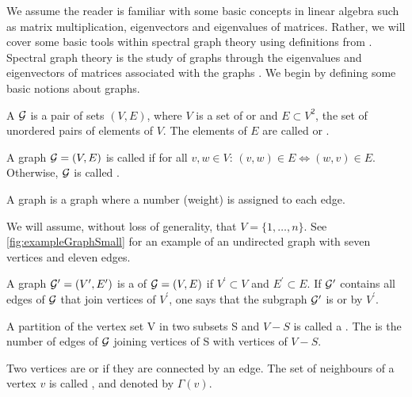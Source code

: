 We assume the reader is familiar with some basic concepts in linear algebra such as matrix multiplication, eigenvectors and eigenvalues of matrices. Rather, we will cover some basic tools within spectral graph theory using definitions from \cite{For10,New06a, Spi12, Spi07}. Spectral graph theory is the study of graphs through the eigenvalues and eigenvectors of matrices associated with the graphs \cite{Spi12}. We begin by defining some basic notions about graphs.
\begin{definition}
	\label{def:graph}
	A  $\mathcal G$ is a pair of sets $(V,E)$, where $V$ is a set of  or  and $E \subset V^{2}$, the set of unordered pairs of elements of $V$. The elements of $E$ are called  or .
\end{definition}
\begin{definition}
	\label{def:undirectedGraph}
	A graph $\mathcal G = (V,E)$ is called  if for all $v,w \in V$: $(v,w) \in E \iff (w,v) \in E$. Otherwise, $\mathcal G$ is called .
\end{definition}
\begin{definition}
	\label{def:weightedGraph}
	A  graph is a graph where a number (weight) is assigned to each edge.
\end{definition}
We will assume, without loss of generality, that $V = \{1,\dots,n\}$. See \cref{fig:exampleGraphSmall} for an example of an undirected graph with seven vertices and eleven edges.
\begin{definition}
	\label{def:subGraph}
	A graph $\mathcal G^{\prime} = (V^{\prime},E^{\prime})$ is a  of $\mathcal G = (V,E)$ if $V^{\prime} \subset V$ and $E^{\prime} \subset E$. If $\mathcal G^{\prime}$ contains all edges of $\mathcal G$ that join vertices of $V^{\prime}$, one says that the subgraph $\mathcal G^{\prime}$ is  or  by $V^{\prime}$.
\end{definition}
\begin{definition}
	\label{def:cuts}
	A partition of the vertex set V in two subsets S and $V-S$ is called a . The  is the number of edges of $\mathcal G$ joining vertices of S with vertices of $V-S$.
\end{definition}
\begin{definition}
	\label{def:neighbourhoodNode}
	Two vertices are  or  if they are connected by an edge. The set of neighbours of a vertex $v$ is called , and denoted by $\Gamma(v)$.
\end{definition}

